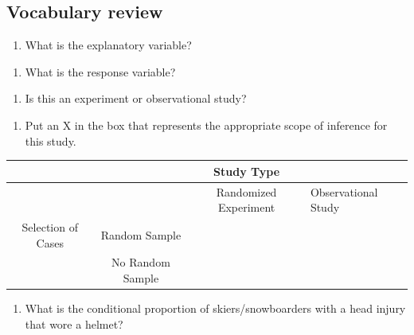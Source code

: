 \documentclass[
]{report}
\providecommand{\tightlist}{%
  \setlength{\itemsep}{0pt}\setlength{\parskip}{0pt}}
\begin{document}
\hypertarget{vocabulary-review}{%
\subsection{Vocabulary review}\label{vocabulary-review}}

\begin{enumerate}
\def\labelenumi{\arabic{enumi}.}
\tightlist
\item
  What is the explanatory variable?
\end{enumerate}

\vspace{0.5in}

\begin{enumerate}
\def\labelenumi{\arabic{enumi}.}
\setcounter{enumi}{1}
\tightlist
\item
  What is the response variable?
\end{enumerate}

\vspace{0.5in}

\begin{enumerate}
\def\labelenumi{\arabic{enumi}.}
\setcounter{enumi}{2}
\tightlist
\item
  Is this an experiment or observational study?
\end{enumerate}

\vspace{0.3in}

\begin{enumerate}
\def\labelenumi{\arabic{enumi}.}
\setcounter{enumi}{3}
\tightlist
\item
  Put an X in the box that represents the appropriate scope of inference for this study.
\end{enumerate}

\begin{longtable}[]{@{}cccl@{}}
\toprule
& & Study Type &\tabularnewline
\midrule
\endhead
& & Randomized Experiment & Observational Study\tabularnewline
Selection of Cases & Random Sample & &\tabularnewline
& No Random Sample & &\tabularnewline
\bottomrule
\end{longtable}

\begin{enumerate}
\def\labelenumi{\arabic{enumi}.}
\setcounter{enumi}{4}
\tightlist
\item
  What is the conditional proportion of skiers/snowboarders with a head injury that wore a helmet?
\end{enumerate}

\vspace{.6in}
\end{document}

